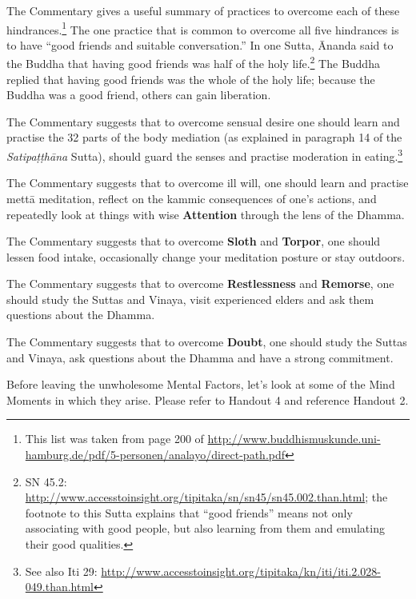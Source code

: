 The Commentary gives a useful summary of \color{blue} practices\color{black} to overcome each of these hindrances.\footnote{This list was taken from page 200 of \url{http://www.buddhismuskunde.uni-hamburg.de/pdf/5-personen/analayo/direct-path.pdf}} The one \color{blue} practice\color{black} that is common to overcome all five hindrances is to have “good friends and suitable conversation.” In one Sutta, Ānanda said to the Buddha that having good friends was half of the holy life.\footnote{SN 45.2: \url{http://www.accesstoinsight.org/tipitaka/sn/sn45/sn45.002.than.html}; the footnote to this Sutta explains that “good friends” means not only associating with good people, but also learning from them and emulating their good qualities.} The Buddha replied that having good friends was the whole of the holy life; because the Buddha was a good friend, others can gain liberation.

The Commentary suggests that to overcome sensual desire one should learn and \color{blue} practise\color{black} the 32 parts of the body mediation (as explained in paragraph 14 of the \textit{Satipaṭṭhāna} Sutta), should guard the senses and \color{blue} practise\color{black} moderation in eating.\footnote{See also Iti 29: \url{http://www.accesstoinsight.org/tipitaka/kn/iti/iti.2.028-049.than.html}}

The Commentary suggests that to overcome ill will, one should learn and \color{blue} practise\color{black} mettā meditation, reflect on the kammic consequences of one’s actions, and repeatedly look at things with wise \textbf{Attention} through the lens of the Dhamma.

The Commentary suggests that to overcome \textbf{Sloth} and \textbf{Torpor}, one should lessen food intake, occasionally change your meditation posture or stay outdoors.

The Commentary suggests that to overcome \textbf{Restlessness} and \textbf{Remorse}, one should study the Suttas and Vinaya, visit experienced elders and ask them questions about the Dhamma.

The Commentary suggests that to overcome \textbf{Doubt}, one should study the Suttas and Vinaya, ask questions about the Dhamma and have a strong commitment.

Before leaving the unwholesome Mental Factors, let’s look at some of the Mind Moments in which they arise. Please refer to Handout 4 and reference Handout 2.


